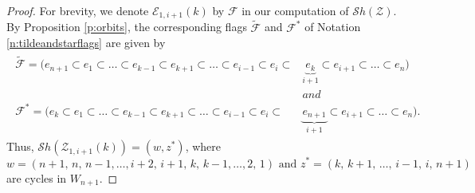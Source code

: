 \documentclass[12pt]{amsart}
\numberwithin{equation}{section}
\newcommand{\cZ}{{\mathcal Z}}
\newcommand{\F}{\mathcal{F}}
\newcommand{\Sh}{\mathcal{S}h}
\begin{document}
\begin{proof}
For brevity, we denote $\mathcal{E}_{1,i+1}(k)$ by $\F$ in our
 computation of $\Sh(\cZ)$.  By Proposition \ref{p:orbits}, the corresponding flags $\tilde{\F}$ and $\F^{*}$ of Notation \ref{n:tildeandstarflags} are given by
\begin{eqnarray}\label{eq:tildeflag}
\begin{split}
\tilde{\F}=(e_{n+1}\subset e_{1}\subset \dots\subset e_{k-1}\subset e_{k+1}\subset\dots\subset e_{i-1}\subset e_{i}\subset &\underbrace{e_{k}}_{i+1}\subset e_{i+1}\subset \dots \subset e_{n})\\
& and\\
\F^{*}=(e_{k}\subset e_{1}\subset \dots\subset e_{k-1}\subset e_{k+1} \subset\dots\subset e_{i-1}\subset e_{i}\subset &\underbrace{e_{n+1}}_{i+1}\subset e_{i+1}\subset \dots \subset e_{n}).
\end{split}
\end{eqnarray}
Thus,  $\Sh({\cZ}_{1,i+1}(k))=(w,z^{*})$, where
\begin{equation}\label{eq:Shdata}
w=(n+1,\, n, \, n-1,\dots, i+2,\, i+1,\, k,\, k-1,\dots, 2,\, 1) \mbox{ and } z^{*}=(k,\, k+1,\, \dots,\, i-1,\, i,\, n+1)
\end{equation}
 are cycles in $W_{n+1}.$


\end{proof}
\end{document}
